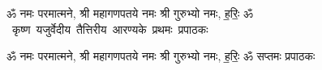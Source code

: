 \documentclass[17pt]{extarticle}
\begin{document}
\begin{titlepage}
    \begin{center}
 
\begin{sanskrit}
    { \Large
    ॐ नमः परमात्मने, श्री महागणपतये नमः
श्री गुरुभ्यो नमः, ह॒रिः॒ ॐ 
    }
    \\
    \vspace{2.5cm}
    \mbox{ \Huge
    कृष्ण यजुर्वेदीय तैत्तिरीय आरण्यके प्रथमः प्रपाठकः   }
\end{sanskrit}
\end{center}

\end{titlepage}
\tableofcontents

ॐ नमः परमात्मने, श्री महागणपतये नमः
श्री गुरुभ्यो नमः, ह॒रिः॒ ॐ      सप्तमः प्रपाठकः \newline

\end{document}
